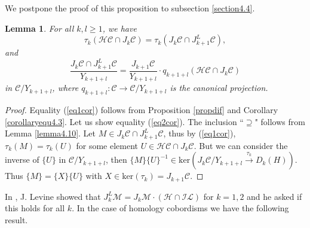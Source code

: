 \documentclass[10pt]{amsart}
\numberwithin{equation}{section}
\numberwithin{equation}{section}
\newtheorem{lemma}[theorem]{Lemma}
\theoremstyle{definition}
\begin{document}
We postpone the proof of this proposition to subsection \ref{section4.4}.

\begin{lemma}\label{corolario2} For all $k,l\geq 1$, we have 
\begin{equation}\label{eq1cor}
\tau_k\left(\mathcal{HC}\cap J_k \mathcal{C}\right)=\tau_k\left(J_k\mathcal{C}\cap J_{k+1}^L\mathcal{C}\right),
\end{equation}
and 
\begin{equation}\label{eq2cor}
\frac{J_k\mathcal{C}\cap J_{k+1}^L\mathcal{C}}{Y_{k+1+l}}= \frac{J_{k+1}\mathcal{C}}{Y_{k+1+l}}\cdot q_{k+1+l}\left(\mathcal{HC}\cap J_k\mathcal{C}\right)
\end{equation}
in  $\mathcal{C}/Y_{k+1+l}$, where $q_{k+1+l}:\mathcal{C}\rightarrow\mathcal{C}/Y_{k+1+l}$ is the canonical projection.
\end{lemma}

\begin{proof}
Equality (\ref{eq1cor}) follows from Proposition \ref{propdif} and Corollary \ref{corollaryequ4.3}. Let us show  equality (\ref{eq2cor}). The inclusion ``$\supseteq$" follows from Lemma \ref{lemma4.10}. Let $M\in J_k\mathcal{C}\cap J_{k+1}^L\mathcal{C}$, thus by   (\ref{eq1cor}), $\tau_k(M)=\tau_k(U)$ for some element $U\in \mathcal{HC}\cap J_k\mathcal{C}$. But we can consider the inverse of $\{U\}$ in $\mathcal{C}/Y_{k+1+l}$, then $\{M\}\{U\}^{-1}\in \text{ker}(J_k\mathcal{C}/Y_{k+1+l}\xrightarrow{\tau_k} D_k(H))$. Thus $\{M\}=\{X\}\{U\}$ with $X\in\text{ker}(\tau_k)=J_{k+1}\mathcal{C}$.
\end{proof}

In \cite[Proposition 6.1]{MR2265877}, J. Levine showed that  $J_k^L\mathcal{M}=J_k\mathcal{M}\cdot\left(\mathcal{H}\cap\mathcal{IL}\right)$ for $k=1,2$ and he asked if this holds for all $k$. In the  case of homology cobordisms we have the following result.
\end{document}
